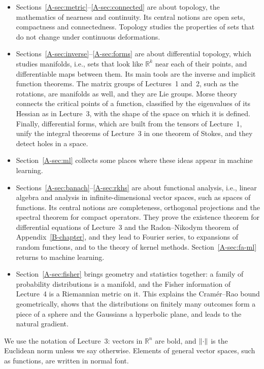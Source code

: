 \begin{itemize}
    \item Sections~\ref{A-sec:metric}--\ref{A-sec:connected} are about topology, the mathematics of nearness and continuity. Its central notions are open sets, compactness and connectedness. Topology studies the properties of sets that do not change under continuous deformations.
    \item Sections~\ref{A-sec:inverse}--\ref{A-sec:forms} are about differential topology, which studies manifolds, i.e., sets that look like $\mathbb{R}^k$ near each of their points, and differentiable maps between them. Its main tools are the inverse and implicit function theorems. The matrix groups of Lectures~1 and~2, such as the rotations, are manifolds as well, and they are Lie groups. Morse theory connects the critical points of a function, classified by the eigenvalues of its Hessian as in Lecture~3, with the shape of the space on which it is defined. Finally, differential forms, which are built from the tensors of Lecture~1, unify the integral theorems of Lecture~3 in one theorem of Stokes, and they detect holes in a space.
    \item Section~\ref{A-sec:ml} collects some places where these ideas appear in machine learning.
    \item Sections~\ref{A-sec:banach}--\ref{A-sec:rkhs} are about functional analysis, i.e., linear algebra and analysis in infinite-dimensional vector spaces, such as spaces of functions. Its central notions are completeness, orthogonal projections and the spectral theorem for compact operators. They prove the existence theorem for differential equations of Lecture~3 and the Radon--Nikodym theorem of Appendix~\ref{B-chapter}, and they lead to Fourier series, to expansions of random functions, and to the theory of kernel methods. Section~\ref{A-sec:fa-ml} returns to machine learning.
    \item Section~\ref{A-sec:fisher} brings geometry and statistics together: a family of probability distributions is a manifold, and the Fisher information of Lecture~4 is a Riemannian metric on it. This explains the Cram\'er--Rao bound geometrically, shows that the distributions on finitely many outcomes form a piece of a sphere and the Gaussians a hyperbolic plane, and leads to the natural gradient.
\end{itemize}
We use the notation of Lecture~3: vectors in $\mathbb{R}^n$ are bold, and $\lVert \cdot \rVert$ is the Euclidean norm unless we say otherwise. Elements of general vector spaces, such as functions, are written in normal font.

